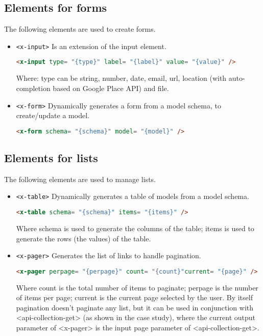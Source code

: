 \subsection{Elements for forms}

The following elements are used to create forms.
\begin{itemize}
\item \texttt{<x-input>} Is an extension of the input element.
\begin{lstlisting}[language=html]
<x-input type= "{type}" label= "{label}" value= "{value}" />
\end{lstlisting}
Where: type can be string, number, date, email, url, location (with auto-completion based on Google Place API) and file.
\item \texttt{<x-form>} Dynamically generates a form from a model schema, to create/update a model.
\begin{lstlisting}[language=html]
<x-form schema= "{schema}" model= "{model}" />
\end{lstlisting}
\end{itemize}

\subsection{Elements for lists}

The following elements are used to manage lists.
\begin{itemize}
\item \texttt{<x-table>} Dynamically generates a table of models from a model schema.
\begin{lstlisting}[language=html]
<x-table schema= "{schema}" items= "{items}" />
\end{lstlisting}
Where schema is used to generate the columns of the table; items is used to generate the rows (the values) of the table.
\item \texttt{<x-pager>} Generates the list of links to handle pagination.
\begin{lstlisting}[language=html]
<x-pager perpage= "{perpage}" count= "{count}"current= "{page}" />
\end{lstlisting}
Where count is the total number of items to paginate; perpage is the number of items per page; current is the current page selected by the user.
By itself pagination doesn’t paginate any list, but it can be used in conjunction with <api-collection-get> (as shown in the case study), where the current output parameter of <x-pager> is the input page parameter of  <api-collection-get>.
\end{itemize}

